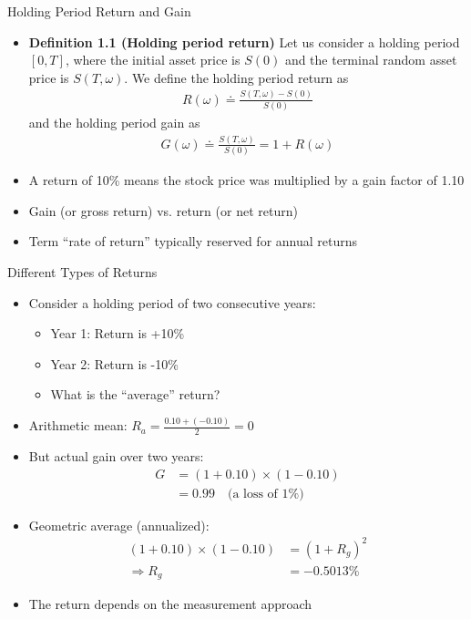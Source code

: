 \documentclass[10pt,handout]{beamer}
\begin{document}
\begin{frame}{Holding Period Return and Gain}
  \begin{itemize}[<+->]
    \item \textbf{Definition 1.1 (Holding period return)} Let us consider a holding period $[0, T]$, where the initial asset price is $S(0)$ and the terminal random asset price is $S(T, \omega)$. We define the holding period return as
    \begin{align*}
      R(\omega) \doteq \tfrac{S(T, \omega) - S(0)}{S(0)}
    \end{align*}
    and the holding period gain as
    \begin{align*}
      G(\omega) \doteq \tfrac{S(T, \omega)}{S(0)} = 1 + R(\omega)
    \end{align*}
    \item A return of 10\% means the stock price was multiplied by a gain factor of 1.10
    \item Gain (or gross return) vs. return (or net return)
    \item Term ``rate of return'' typically reserved for annual returns
  \end{itemize}
\end{frame}

\begin{frame}{Different Types of Returns}
  \begin{itemize}[<+->]
    \item Consider a holding period of two consecutive years:
    \begin{itemize}
      \item Year 1: Return is +10\%
      \item Year 2: Return is -10\%
      \item What is the ``average'' return?
    \end{itemize}
    \item Arithmetic mean: $R_a = \tfrac{0.10 + (-0.10)}{2} = 0$
    \item But actual gain over two years:
    \begin{align*}
      G &= (1 + 0.10) \times (1 - 0.10) \\
      &= 0.99 \quad \text{(a loss of 1\%)}
    \end{align*}
    \item Geometric average (annualized): 
    \begin{align*}
      (1 + 0.10) \times (1 - 0.10) &= (1 + R_g)^2 \\
      \Rightarrow R_g &= -0.5013\%
    \end{align*}
    \item The return depends on the measurement approach
  \end{itemize}
\end{frame}
\end{document}
